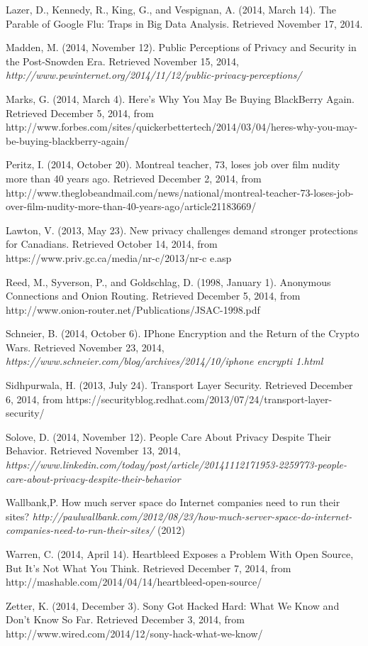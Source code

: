 \documentclass[12pt]{article}
\begin{document}
\begin{thebibliography}{99}
	Lazer, D., Kennedy, R., King, G., and Vespignan, A. (2014, March 14). The Parable of Google Flu: Traps in Big Data Analysis. Retrieved November 17, 2014.

	Madden, M. (2014, November 12). Public Perceptions of Privacy and Security in the Post-Snowden Era. Retrieved November 15, 2014, {\sl http://www.pewinternet.org/2014/11/12/public-privacy-perceptions/}

	Marks, G. (2014, March 4). Here's Why You May Be Buying BlackBerry Again. Retrieved December 5, 2014, from http://www.forbes.com/sites/quickerbettertech/2014/03/04/heres-why-you-may-be-buying-blackberry-again/

	Peritz, I. (2014, October 20). Montreal teacher, 73, loses job over film nudity more than 40 years ago. Retrieved December 2, 2014, from http://www.theglobeandmail.com/news/national/montreal-teacher-73-loses-job-over-film-nudity-more-than-40-years-ago/article21183669/

	Lawton, V. (2013, May 23). New privacy challenges demand stronger protections for Canadians. Retrieved October 14, 2014, from https://www.priv.gc.ca/media/nr-c/2013/nr-c \textunderscore e.asp

	Reed, M., Syverson, P., and Goldschlag, D. (1998, January 1). Anonymous Connections and Onion Routing. Retrieved December 5, 2014, from http://www.onion-router.net/Publications/JSAC-1998.pdf

	Schneier, B. (2014, October 6). IPhone Encryption and the Return of the Crypto Wars. Retrieved November 23, 2014, {\sl https://www.schneier.com/blog/archives/2014/10/iphone \textunderscore encrypti \textunderscore 1.html}

	Sidhpurwala, H. (2013, July 24). Transport Layer Security. Retrieved December 6, 2014, from https://securityblog.redhat.com/2013/07/24/transport-layer-security/

	Solove, D. (2014, November 12). People Care About Privacy Despite Their Behavior. Retrieved November 13, 2014, {\sl https://www.linkedin.com/today/post/article/20141112171953-2259773-people-care-about-privacy-despite-their-behavior}

	Wallbank,P. How much server space do Internet companies need to run their sites? {\sl http://paulwallbank.com/2012/08/23/how-much-server-space-do-internet-companies-need-to-run-their-sites/} (2012)

	Warren, C. (2014, April 14). Heartbleed Exposes a Problem With Open Source, But It's Not What You Think. Retrieved December 7, 2014, from http://mashable.com/2014/04/14/heartbleed-open-source/

	Zetter, K. (2014, December 3). Sony Got Hacked Hard: What We Know and Don’t Know So Far. Retrieved December 3, 2014, from http://www.wired.com/2014/12/sony-hack-what-we-know/

\end{thebibliography}
\end{document}
